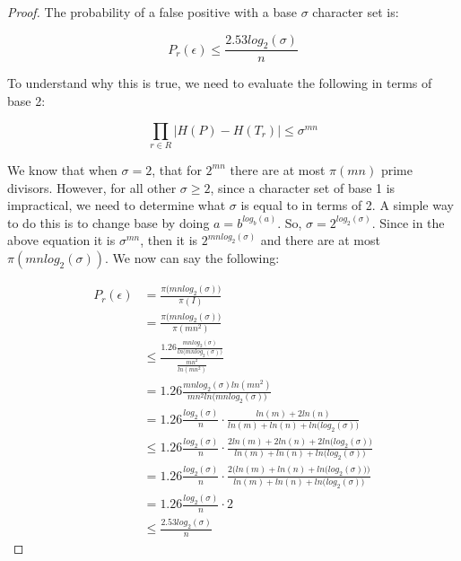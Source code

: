 \documentclass[11pt]{article}
\begin{document}

\bigskip
{}

\begin{proof}

The probability of a false positive with a base $\sigma$ character set is:

$$
P_r(\epsilon) \leq \frac{2.53log_2(\sigma)}{n}
$$

To understand why this is true, we need to evaluate the following in terms of base 2:

$$
\prod_{r \in R} |H(P) - H(T_r)| \leq \sigma^{mn}
$$

We know that when $\sigma = 2$, that for $2^{mn}$ there are at most $\pi(mn)$ prime divisors.
However, for all other $\sigma \geq 2$, since a character set of base 1 is impractical, we
need to determine what $\sigma$ is equal to in terms of 2. A simple way to do this is to change
base by doing $a = b ^ {log_b(a)}$. So, $\sigma = 2^{log_2(\sigma)}$. Since in the above equation
it is $\sigma^{mn}$, then it is $2^{mnlog_2(\sigma)}$ and there are at most $\pi(mnlog_2(\sigma))$.
We now can say the following:

\begin{align*}
P_r(\epsilon) &= \frac{ \pi\big(mnlog_2(\sigma)\big) }{ \pi(I) } \\
              &= \frac{ \pi\big(mnlog_2(\sigma)\big) }{ \pi(mn^2) } \\
              &\leq \frac{ 1.26\frac{ mnlog_2(\sigma) }{ ln\big(mnlog_2(\sigma)\big) } }{ \frac{ mn^2 }{ ln(mn^2) } } \\
              &= 1.26 \frac{ mnlog_2(\sigma)ln(mn^2) }{ mn^2ln\big(mnlog_2(\sigma)\big) } \\
              &= 1.26 \frac{ log_2(\sigma) }{ n } \cdot \frac{ ln(m) + 2ln(n) }{ ln(m) + ln(n) + ln \big( log_2(\sigma) \big) } \\
              &\leq 1.26 \frac{ log_2(\sigma) }{ n } \cdot \frac{ 2ln(m) + 2ln(n) + 2ln\big(log_2(\sigma)\big) }{ ln(m) + ln(n) + ln\big(log_2(\sigma)\big) } \\
              &= 1.26 \frac{ log_2(\sigma) }{ n } \cdot \frac{ 2\Big(ln(m) + ln(n) + ln\big(log_2(\sigma)\big)\Big) }{ ln(m) + ln(n) + ln\big(log_2(\sigma)\big) } \\
              &= 1.26 \frac{ log_2(\sigma) }{ n } \cdot 2 \\
              &\leq \frac{ 2.53log_2(\sigma) }{ n }
\end{align*}

\end{proof}
\end{document}
